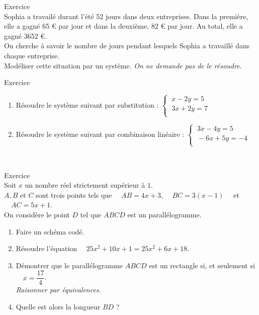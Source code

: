 \documentclass[a4paper,11pt,eval]{nsi}
\newcounter{exoNum}
\newcommand{\exo}[1]
{
	\addtocounter{exoNum}{1}
	{\titlefont\color{UGLiBlue}\Large Exercice\ \theexoNum\ \normalsize{#1}}\smallskip	
}
\begin{document}
\exo{} \\
Sophia a travailé durant l'été 52 jours dans deux entreprises. Dans la première, elle a gagné 65 € par jour et dans la deuxième, 82 € par jour. Au total, elle a gagné 3652 €.\\
On cherche à savoir le nombre de jours pendant lesquels Sophia a travaillé dans chaque entreprise.\\[.5em]
Modéliser cette situation par un système. \textit{On ne demande pas de le résoudre.}\\[.5em]

\exo{}
    \begin{enumerate}
        \item Résoudre le système suivant par substitution : $\left\{
			\begin{array}{l}
				\ x-2y=5 \\
				\ 3x+2y=7 \\
			\end{array} \right.$
        \item Résoudre le système suivant par combinaison linéaire : $\left\{
			\begin{array}{l}
				\ 3x-4y=5 \\
				\ -6x+5y=-4 \\
			\end{array} \right.$
    \end{enumerate}

\\

\exo{}\\
Soit $x$ un nombre réel strictement supérieur à $1$.\\
$A, B$ et $C$ sont trois points tels que $\quad AB=4x+3$, $\quad BC=3(x-1)\quad$ et $\quad AC=5x+1$.\\
On considère le point $D$ tel que $ABCD$ est un parallélogramme.
\begin{enumerate}
	\item 	Faire un schéma codé.\\
	\vspace*{2.2cm}
	\item   Résoudre l'équation $\quad 25x^2+10x+1=25x^2+6x+18$.\\[.5em]
	\item 	Démontrer que le parallélogramme $ABCD$ est un rectangle si, et seulement si $\quad x=\dfrac{17}{4}$.\\
	\textit{Raisonner par équivalences.}\\[.5em]
	\item	 Quelle est alors la longueur $BD$ ?\\[.5em]
\end{enumerate}
\end{document}
